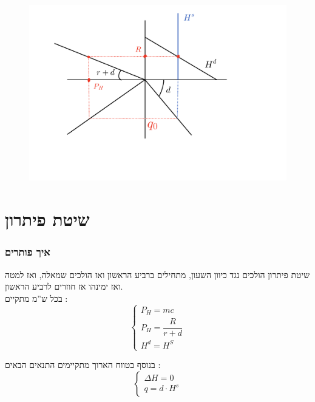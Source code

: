 \documentclass[usenames,dvipsnames, 10pt]{beamer}
\newcommand{\D}[1]{\Delta #1}
\begin{document}
\begin{RTL}
\begin{frame}[allowframebreaks]
\framebreak
\begin{figure}
    \begin{small}
        \begin{center}
            \includegraphics[width=1.2\textwidth]{figures/SCR-20231209-nblm.png}
        \end{center}
    \end{small}
\end{figure}


\end{frame}

\section{שיטת פיתרון}

\begin{frame}
    \frametitle{איך פותרים}
    \begin{block}{שיטת פיתרון}
        הולכים נגד כיוון השעון, מתחילים ברביע הראשון ואז הולכים שמאלה, ואז למטה ואז ימינהו אז חוזרים לרביע הראשון.
        \\
        בכל ש''מ מתקיים :
        $$\begin{cases}
            P_H = mc \\ 
            P_H = \dfrac{R}{r+d}\\ 
            H^d = H^S
        \end{cases}$$

        בנוסף בטווח הארוך מתקיימים התנאים הבאים :
        $$\begin{cases}
            \D H = 0 \\ 
            q = d \cdot H^s
        \end{cases}$$
    \end{block}
    


\end{frame}
\end{RTL}
\end{document}
